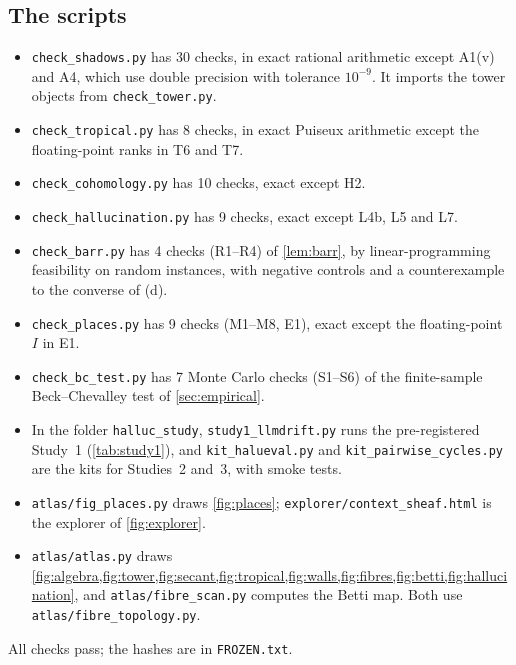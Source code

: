 \documentclass[11pt]{article}
\theoremstyle{definition}
\begin{document}
\subsection{The scripts}
\begin{itemize}
\item \texttt{check\_shadows.py} has 30 checks, in exact rational arithmetic except A1(v) and A4, which use double precision with
  tolerance $10^{-9}$. It imports the tower objects from \texttt{check\_tower.py}.
\item \texttt{check\_tropical.py} has 8 checks, in exact Puiseux arithmetic except the floating-point ranks in T6 and T7.
\item \texttt{check\_cohomology.py} has 10 checks, exact except H2.
\item \texttt{check\_hallucination.py} has 9 checks, exact except L4b, L5 and L7.
\item \texttt{check\_barr.py} has 4 checks (R1--R4) of \cref{lem:barr}, by linear-programming feasibility on random instances, with negative controls and a counterexample to the converse of (d).
\item \texttt{check\_places.py} has 9 checks (M1--M8, E1), exact except the floating-point $I$ in E1.
\item \texttt{check\_bc\_test.py} has 7 Monte Carlo checks (S1--S6) of the finite-sample Beck--Chevalley test of \cref{sec:empirical}.
\item In the folder \texttt{halluc\_study}, \texttt{study1\_llmdrift.py} runs the pre-registered Study~1 (\cref{tab:study1}), and
  \texttt{kit\_halueval.py} and \texttt{kit\_pairwise\_cycles.py} are the kits for Studies~2 and~3, with smoke tests.
\item \texttt{atlas/fig\_places.py} draws \cref{fig:places}; \texttt{explorer/context\_sheaf.html} is the explorer of \cref{fig:explorer}.
\item \texttt{atlas/atlas.py} draws \cref{fig:algebra,fig:tower,fig:secant,fig:tropical,fig:walls,fig:fibres,fig:betti,fig:hallucination}, and
  \texttt{atlas/fibre\_scan.py} computes the Betti map. Both use \texttt{atlas/fibre\_topology.py}.
\end{itemize}
All checks pass; the hashes are in \texttt{FROZEN.txt}.
\end{document}

